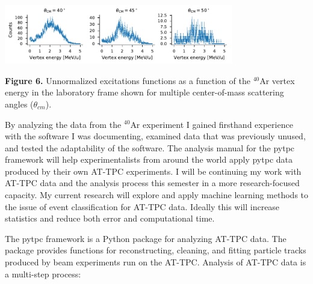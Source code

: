 \documentclass[ansiepaper,portrait]{baposter}
\begin{document}
\begin{poster}
{\begin{center}
\includegraphics [width=100mm] {angular_excitation_hists_POSTER.pdf}
\end{center}
\small{\textbf{Figure 6.} Unnormalized excitations functions as a function of the $^{40}$Ar vertex energy in the laboratory frame shown for multiple center-of-mass scattering angles ($\theta_{cm}$).}
}

{\small{ By analyzing the data from the $^{40}$Ar experiment I gained firsthand experience with the software I was documenting, examined data that was previously unused, and tested the adaptability of the software. The analysis manual for the pytpc framework will help experimentalists from around the world apply pytpc data produced by their own AT-TPC experiments.
I will be continuing my work with AT-TPC data and the analysis process this semester in a more research-focused capacity. My current research will explore and apply machine learning methods to the issue of event classification for AT-TPC data. Ideally this will increase statistics and reduce both error and computational time. }
}
{\small{The pytpc framework is a Python package for analyzing AT-TPC data. The package provides functions for reconstructing, cleaning, and fitting particle tracks produced by beam experiments run on the AT-TPC. Analysis of AT-TPC data is a multi-step process:

}}
\end{poster}
\end{document}
